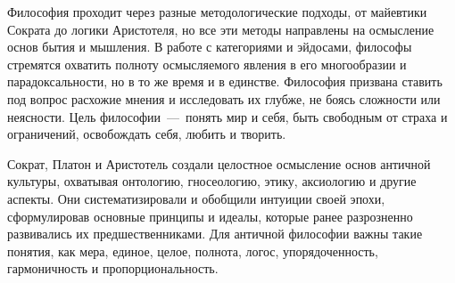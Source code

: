 
Философия проходит через разные методологические подходы, от майевтики Сократа до логики Аристотеля, но все эти методы направлены на осмысление основ бытия и мышления. В работе с категориями и эйдосами, философы стремятся охватить полноту осмысляемого явления в его многообразии и парадоксальности, но в то же время и в единстве. Философия призвана ставить под вопрос расхожие мнения и исследовать их глубже, не боясь сложности или неясности. Цель философии~---~понять мир и себя, быть свободным от страха и ограничений, освобождать себя, любить и творить.


Сократ, Платон и Аристотель создали целостное осмысление основ античной культуры, охватывая онтологию, гносеологию, этику, аксиологию и другие аспекты. Они систематизировали и обобщили интуиции своей эпохи, сформулировав основные принципы и идеалы, которые ранее разрозненно развивались их предшественниками. Для античной философии важны такие понятия, как мера, единое, целое, полнота, логос, упорядоченность, гармоничность и пропорциональность.

